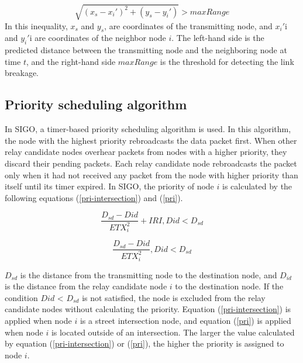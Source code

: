 \documentclass[conference]{IEEEtran}
\begin{document}
\begin{equation}
\label{expired_links}
\sqrt{\left(x_s - x_i'\right)^2 + \left(y_s - y_i'\right)} > maxRange
\end{equation}
In this inequality, $x_s$ and  $y_s$, are coordinates of the  transmitting node, and $x_i'$i and $y_i'$i are coordinates of the neighbor node $i$.
The left-hand side is the predicted distance between the transmitting node and the neighboring node at time $t$, and the right-hand side $maxRange$ is the threshold for detecting the link breakage.


\subsection{Priority scheduling algorithm}
\label{priority}
In SIGO, a timer-based priority scheduling algorithm is used. 
In this algorithm, the node with the highest priority rebroadcasts the data packet first. 
When other relay candidate nodes overhear packets from nodes with a higher priority, they discard their pending packets. Each relay candidate node rebroadcasts the packet only when it had not received any packet from the node with higher priority than itself until its timer expired.
In SIGO, the priority of node $i$ is calculated by the following equations (\ref{pri-intersection}) and (\ref{pri}).


\begin{equation}
\label{pri-intersection}
\frac{D_{sd} - D{id}}{ETX_{i}^{2}} + IRI,  D{id} < D_{sd}
\end{equation}

\begin{equation}
\label{pri}
\frac{D_{sd} - D{id}}{ETX_{i}^{2}} ,   D{id} < D_{sd}
\end{equation}

$D_{sd}$ is the distance from the transmitting node to the destination node, and $D_{id}$ is the distance from the relay candidate node $i$ to the destination node. If the condition $D{id}$ < $D_{sd}$ is not satisfied, the node is excluded from the relay candidate nodes without calculating the priority. 
Equation (\ref{pri-intersection}) is applied when node $i$ is a street intersection node, and equation (\ref{pri}) is applied when node $i$ is located outside of an intersection. 
The larger the value calculated by equation (\ref{pri-intersection}) or (\ref{pri}), the higher the priority is assigned to node $i$. 
\end{document}
